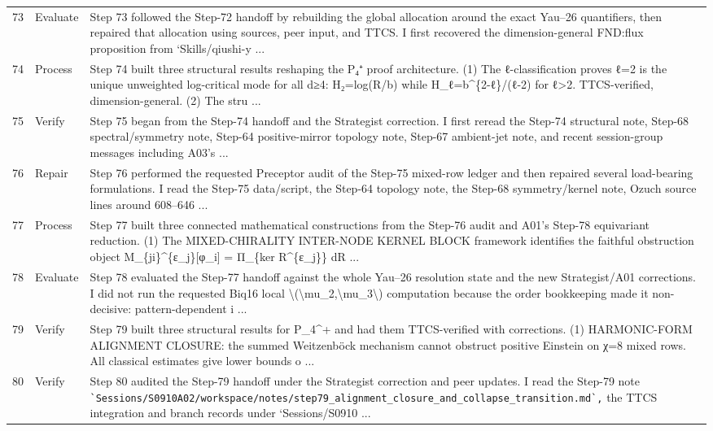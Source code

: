 \documentclass[UTF8,fontset=fandol,zihao=-4]{ctexart}
\begin{document}
\begin{longtable}{r p{} >{\raggedright\arraybackslash}p{}}
73 & Evaluate & Step 73 followed the Step-72 handoff by rebuilding the global allocation around the exact Yau--26 quantifiers, then repaired that allocation using sources, peer input, and TTCS. I first recovered the dimension-general FND:flux proposition from `Skills/qiushi-y ...\\
74 & Process & Step 74 built three structural results reshaping the P₄⁺ proof architecture. (1) The ℓ-classification proves ℓ=2 is the unique unweighted log-critical mode for all d≥4: H₂=log(R/b) while H\_ℓ=b\textasciicircum{}\{2-ℓ\}/(ℓ-2) for ℓ>2. TTCS-verified, dimension-general. (2) The stru ...\\
75 & Verify & Step 75 began from the Step-74 handoff and the Strategist correction. I first reread the Step-74 structural note, Step-68 spectral/symmetry note, Step-64 positive-mirror topology note, Step-67 ambient-jet note, and recent session-group messages including A03's ...\\
76 & Repair & Step 76 performed the requested Preceptor audit of the Step-75 mixed-row ledger and then repaired several load-bearing formulations. I read the Step-75 data/script, the Step-64 topology note, the Step-68 symmetry/kernel note, Ozuch source lines around 608--646 ...\\
77 & Process & Step 77 built three connected mathematical constructions from the Step-76 audit and A01's Step-78 equivariant reduction. (1) The MIXED-CHIRALITY INTER-NODE KERNEL BLOCK framework identifies the faithful obstruction object M\_\{ji\}\textasciicircum{}\{ε\_j\}[φ\_i] = Π\_\{ker R\textasciicircum{}\{ε\_j\}\} dR ...\\
78 & Evaluate & Step 78 evaluated the Step-77 handoff against the whole Yau--26 resolution state and the new Strategist/A01 corrections. I did not run the requested Biq16 local \textbackslash{}(\textbackslash{}mu\_2,\textbackslash{}mu\_3\textbackslash{}) computation because the order bookkeeping made it non-decisive: pattern-dependent i ...\\
79 & Verify & Step 79 built three structural results for P\_4\textasciicircum{}+ and had them TTCS-verified with corrections. (1) HARMONIC-FORM ALIGNMENT CLOSURE: the summed Weitzenböck mechanism cannot obstruct positive Einstein on χ=8 mixed rows. All classical estimates give lower bounds o ...\\
80 & Verify & Step 80 audited the Step-79 handoff under the Strategist correction and peer updates. I read the Step-79 note \nolinkurl{`Sessions/S0910A02/workspace/notes/step79_alignment_closure_and_collapse_transition.md`,} the TTCS integration and branch records under `Sessions/S0910 ...\\

\end{longtable}
\end{document}
